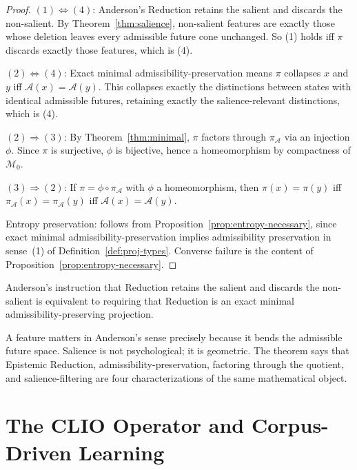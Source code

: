 \documentclass[12pt, a4paper, oneside]{book}
\newcommand{\Adm}{\mathcal{A}}
\newcommand{\M}{\mathcal{M}}
\newcommand{\proj}{\pi}
\newcommand{\projA}{\pi_{\!\Adm}}
\begin{document}
\begin{proof}
$(1) \Leftrightarrow (4)$: Anderson's Reduction retains the salient and
discards the non-salient. By Theorem~\ref{thm:salience}, non-salient
features are exactly those whose deletion leaves every admissible future
cone unchanged. So (1) holds iff $\proj$ discards exactly those features,
which is (4).

$(2) \Leftrightarrow (4)$: Exact minimal admissibility-preservation means
$\proj$ collapses $x$ and $y$ iff $\Adm(x) = \Adm(y)$. This collapses
exactly the distinctions between states with identical admissible futures,
retaining exactly the salience-relevant distinctions, which is (4).

$(2) \Rightarrow (3)$: By Theorem~\ref{thm:minimal}, $\proj$ factors
through $\projA$ via an injection $\phi$. Since $\proj$ is surjective,
$\phi$ is bijective, hence a homeomorphism by compactness of $\M_0$.

$(3) \Rightarrow (2)$: If $\proj = \phi \circ \projA$ with $\phi$ a
homeomorphism, then $\proj(x) = \proj(y)$ iff $\projA(x) = \projA(y)$
iff $\Adm(x) = \Adm(y)$.

Entropy preservation: follows from Proposition~\ref{prop:entropy-necessary},
since exact minimal admissibility-preservation implies admissibility
preservation in sense~(1) of Definition~\ref{def:proj-types}. Converse
failure is the content of Proposition~\ref{prop:entropy-necessary}.
\end{proof}

\begin{corollary}
Anderson's instruction that Reduction retains the salient and discards
the non-salient is equivalent to requiring that Reduction is an exact
minimal admissibility-preserving projection.
\end{corollary}

\begin{remark}
A feature matters in Anderson's sense precisely because it bends the
admissible future space. Salience is not psychological; it is geometric.
The theorem says that Epistemic Reduction, admissibility-preservation,
factoring through the quotient, and salience-filtering are four
characterizations of the same mathematical object.
\end{remark}

\chapter{The CLIO Operator and Corpus-Driven Learning}
\label{ch:clio}
\end{document}
